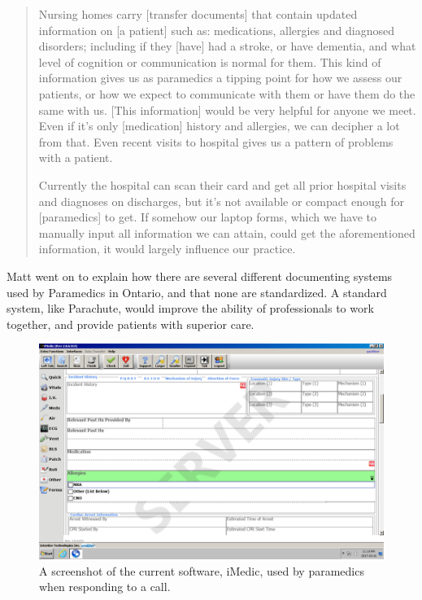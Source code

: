 \blockquote{Nursing homes carry [transfer documents] that contain updated information on [a patient] such as: medications, allergies and diagnosed disorders; including if they [have] had a stroke, or have dementia, and what level of cognition or communication is normal for them. This kind of information gives us as paramedics a tipping point for how we assess our patients, or how we expect to communicate with them or have them do the same with us. [This information] would be very helpful for anyone we meet. Even if it's only [medication] history and allergies, we can decipher a lot from that. Even recent visits to hospital gives us a pattern of problems with a patient.

Currently the hospital can scan their card and get all prior hospital visits and diagnoses on discharges, but it's not available or compact enough for [paramedics] to get. If somehow our laptop forms, which we have to manually input all information we can attain, could get the aforementioned information, it would largely influence our practice.
}

Matt went on to explain how there are several different documenting systems used by Paramedics in Ontario, and that none are standardized. A standard system, like Parachute, would improve the ability of professionals to work together, and provide patients with superior care.

\begin{figure}[h]
  \centering
  \includegraphics[width=\linewidth]{iMedic.png}
  \captionsetup{format=hang}
  \caption[Screenshot of iMedic Software]{A screenshot of the current software, iMedic, used by paramedics when responding to a call.}
  \label{fig:iMed1}
\end{figure}

